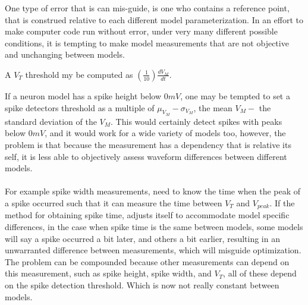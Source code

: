     One type of error that is can mis-guide, is one who contains a reference point, that is construed relative to each different model parameterization. In an effort to make computer code run without error, under very many different possible conditions, it is tempting to make model measurements that are not objective and unchanging between models. 
    
    A $V_{T}$ threshold my be computed as $(\frac{1}{10})\frac{dV_{M}}{dt}$.
    
    If a neuron model has a spike height below $0mV$, one may be tempted to set a spike detectors threshold as a multiple of $\mu_{V_{M}} - \sigma_{{V_{M}}}$, the mean $V_{M} -$ the standard deviation of the $V_{M}$. This would certainly detect spikes with peaks below $0mV$, and it would work for a wide variety of models too, however, the problem is that because the measurement has a dependency that is relative its self, it is less able to objectively assess waveform differences between  different models.\\
    \\
    For example spike width measurements, need to know the time when the peak of a spike occurred such that it can measure the time between $V_{T}$ and $V_{peak}$. If the method for obtaining spike time, adjusts itself to accommodate model specific differences, in the case when spike time is the same between models, some models will say a spike occurred a bit later, and others a bit earlier, resulting in an unwarranted difference between measurements, which will misguide optimization. The problem can be compounded because other measurements can depend on this measurement, such as spike height, spike width, and $V_{T}$, all of these depend on the spike detection threshold. Which is now not really constant between models.\\
    \\
